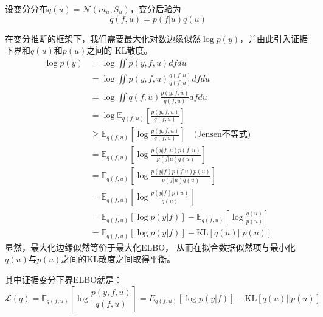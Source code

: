 设变分分布$q(u) = \mathcal N(m_u, S_u)$，变分后验为
\begin{equation}
    q(f, u) = p(f | u) q(u)
\end{equation}

在变分推断的框架下，我们需要最大化对数边缘似然$\log p(y)$，并由此引入证据下界和$q(u)$和$p(u)$之间的
KL散度。
\begin{equation}
    \begin{aligned}
        \log p(y) &= \log \iint p(y, f, u) df du \\
        &= \log \iint p(y, f, u) \frac{q(f, u)}{q(f, u)} df du \\
        &= \log \iint q(f, u) \frac{p(y, f, u)}{q(f, u)} df du \\
        &= \log \mathbb E_{q(f, u)} \left [ \frac{p(y, f, u)}{q(f, u)} \right ] \\
        &\geq \mathbb E_{q(f, u)} \left [ \log \frac{p(y, f, u)}{q(f, u)} \right ] \quad \text{(Jensen不等式)} \\
        &= \mathbb E_{q(f, u)} \left [ \log \frac{p(y|f, u)p(f, u)}{p(f|u)q(u)} \right ] \\
        &= \mathbb E_{q(f, u)} \left [ \log \frac{p(y|f)p(f|u)p(u)}{p(f|u)q(u)} \right ] \\
        &= \mathbb E_{q(f, u)} \left [ \log \frac{p(y|f)p(u)}{q(u)} \right ] \\
        &= \mathbb E_{q(f, u)} \left [ \log p(y|f) \right ] - \mathbb E_{q(f, u)} \left [ \log \frac{q(u)}{p(u)} \right ] \\
        &= \mathbb E_{q(f, u)} \left [ \log p(y|f) \right ] - \text{KL} \left [q(u) || p(u) \right ]
    \end{aligned}
\end{equation}
显然，最大化边缘似然等价于最大化ELBO，
从而在拟合数据似然项与最小化$q(u)$与$p(u)$之间的KL散度之间取得平衡。

其中证据变分下界ELBO就是：
\begin{equation}
    \mathcal L(q) = \mathbb E_{q(f, u)} \left [ \log \frac{p(y, f, u)}{q(f, u)} \right ]
    = E_{q(f, u)} \left [ \log p(y|f) \right ] - \text{KL} \left [q(u) || p(u) \right ]
\end{equation}


